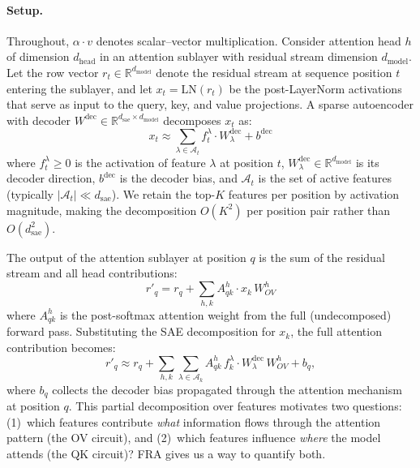 \documentclass{article}
\theoremstyle{plain}
\theoremstyle{definition}
\theoremstyle{remark}
\newcommand{\Wdec}{W^{\mathrm{dec}}}
\newcommand{\WOV}{W_{OV}}
\newcommand{\dmodel}{d_{\mathrm{model}}}
\newcommand{\dhead}{d_{\mathrm{head}}}
\newcommand{\dsae}{d_{\mathrm{sae}}}
\newcommand{\RR}{\mathbb{R}}
\begin{document}
\paragraph{Setup.} Throughout, $\alpha \cdot v$ denotes scalar--vector multiplication. Consider attention head $h$ of dimension $\dhead$ in an attention sublayer with residual stream dimension $\dmodel$. Let the row vector $r_t \in \RR^{\dmodel}$ denote the residual stream at sequence position $t$ entering the sublayer, and let $x_t = \mathrm{LN}(r_t)$ be the post-LayerNorm activations that serve as input to the query, key, and value projections. A sparse autoencoder with decoder $\Wdec \in \RR^{\dsae \times \dmodel}$ decomposes $x_t$ as:
\begin{equation}
    x_t \approx \sum_{\lambda \in \mathcal{A}_t} f_t^\lambda \cdot W^{\mathrm{dec}}_\lambda + b^{\mathrm{dec}}
    \label{eq:sae}
\end{equation}
where $f_t^\lambda \geq 0$ is the activation of feature $\lambda$ at position $t$, $W^{\mathrm{dec}}_\lambda \in \RR^{\dmodel}$ is its decoder direction, $b^{\mathrm{dec}}$ is the decoder bias, and $\mathcal{A}_t$ is the set of active features (typically $|\mathcal{A}_t| \ll \dsae$). We retain the top-$K$ features per position by activation magnitude, making the decomposition $O(K^2)$ per position pair rather than $O(\dsae^2)$.

The output of the attention sublayer at position $q$ is the sum of the residual stream and all head contributions:
\begin{equation}
    r'_q = r_q + \sum_{h,k} A^h_{qk} \cdot x_k\,\WOV^h
    \label{eq:full_layer}
\end{equation}
where $A^h_{qk}$ is the post-softmax attention weight from the full (undecomposed) forward pass. Substituting the SAE decomposition for $x_k$, the full attention contribution becomes:
\begin{equation}
      r'_q \approx r_q
      + \sum_{h,k} \sum_{\lambda \in \mathcal{A}_k}
          A^h_{qk}\, f_k^\lambda \cdot W^{\mathrm{dec}}_\lambda\, \WOV^h
      + b_q,
      \label{eq:partial_decomp}
  \end{equation}
where $b_q$ collects the decoder bias propagated through the attention mechanism at position $q$. This partial decomposition over features motivates two questions: (1)~which features contribute \emph{what} information flows through the attention pattern (the OV circuit), and (2)~which features influence \emph{where} the model attends (the QK circuit)? FRA gives us a way to quantify both.
\end{document}
